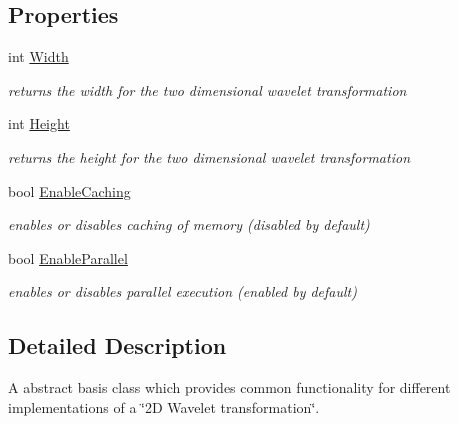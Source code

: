 \subsection*{\-Properties}
\begin{DoxyCompactItemize}
\item 
int \hyperlink{class_turbo_wavelets_1_1_wavelet2_d_a30058c5e0e5bd95b29bc080efbcf9083}{\-Width}
\begin{DoxyCompactList}\small\item\em returns the width for the two dimensional wavelet transformation \end{DoxyCompactList}\item 
int \hyperlink{class_turbo_wavelets_1_1_wavelet2_d_a277d0f89d73f839350c64a83ccd76ff6}{\-Height}
\begin{DoxyCompactList}\small\item\em returns the height for the two dimensional wavelet transformation \end{DoxyCompactList}\item 
bool \hyperlink{class_turbo_wavelets_1_1_wavelet2_d_abbd41e51d24f8a7912ae47dd364ed4fb}{\-Enable\-Caching}
\begin{DoxyCompactList}\small\item\em enables or disables caching of memory (disabled by default) \end{DoxyCompactList}\item 
bool \hyperlink{class_turbo_wavelets_1_1_wavelet2_d_abec21e54c6ab8cce0e02ef3ad64ae5af}{\-Enable\-Parallel}
\begin{DoxyCompactList}\small\item\em enables or disables parallel execution (enabled by default) \end{DoxyCompactList}\end{DoxyCompactItemize}


\subsection{\-Detailed \-Description}
\-A abstract basis class which provides common functionality for different implementations of a \char`\"{}2\-D Wavelet transformation\char`\"{}. 



